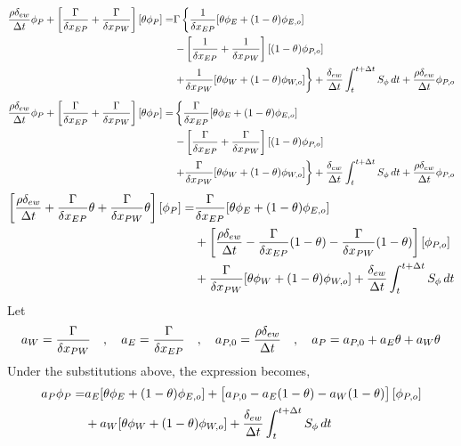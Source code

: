 \documentclass[class=report, 12pt, crop=false]{standalone}
\begin{document}
\begin{center}
\begin{equation*}
\begin{split}
\frac{\rho\delta_{ew}}{\Delta t}\phi_{P} + \left[\frac{\Gamma}{\delta x_{EP}} + \frac{\Gamma}{\delta x_{PW}}\right][\theta\phi_{P}] = & \Gamma \left\{\frac{1}{\delta x_{EP}}[\theta\phi_{E} + (1-\theta)\phi_{E,o}]\right.\\ & \left. - \left[\frac{1}{\delta x_{EP}} + \frac{1}{\delta x_{PW}}\right][(1-\theta)\phi_{P,o}] \right.\\ & \left.  + \frac{1}{\delta x_{PW}}[\theta\phi_{W} + (1-\theta)\phi_{W,o}]\right\} + \frac{\delta_{ew}}{\Delta t}\int^{t+\Delta t}_{t} S_\phi\,dt + \frac{\rho\delta_{ew}}{\Delta t}\phi_{P,o} 
\end{split}
\end{equation*}
\begin{equation*}
\begin{split}
\frac{\rho\delta_{ew}}{\Delta t}\phi_{P} + \left[\frac{\Gamma}{\delta x_{EP}} + \frac{\Gamma}{\delta x_{PW}}\right][\theta\phi_{P}] = & \left\{\frac{\Gamma }{\delta x_{EP}}[\theta\phi_{E} + (1-\theta)\phi_{E,o}]\right.\\ & \left. - \left[\frac{\Gamma }{\delta x_{EP}} + \frac{\Gamma }{\delta x_{PW}}\right][(1-\theta)\phi_{P,o}] \right.\\ & \left.  + \frac{\Gamma }{\delta x_{PW}}[\theta\phi_{W} + (1-\theta)\phi_{W,o}]\right\} + \frac{\delta_{ew}}{\Delta t}\int^{t+\Delta t}_{t} S_\phi\,dt + \frac{\rho\delta_{ew}}{\Delta t}\phi_{P,o} 
\end{split}
\end{equation*}
\begin{equation*}
\begin{split}
\left[\frac{\rho\delta_{ew}}{\Delta t} + \frac{\Gamma}{\delta x_{EP}}\theta + \frac{\Gamma}{\delta x_{PW}}\theta\right][\phi_{P}] = & \frac{\Gamma }{\delta x_{EP}}[\theta\phi_{E} + (1-\theta)\phi_{E,o}]\\ & +\left[\frac{\rho\delta_{ew}}{\Delta t} - \frac{\Gamma }{\delta x_{EP}}(1-\theta) - \frac{\Gamma }{\delta x_{PW}}(1-\theta)\right][\phi_{P,o}] \\ &  + \frac{\Gamma }{\delta x_{PW}}[\theta\phi_{W} + (1-\theta)\phi_{W,o}] + \frac{\delta_{ew}}{\Delta t}\int^{t+\Delta t}_{t} S_\phi\,dt 
\end{split}
\end{equation*}
Let 
$$a_W = \frac{\Gamma}{\delta x_{PW}} \quad,\quad a_E = \frac{\Gamma}{\delta x_{EP}} \quad,\quad a_{P,0} = \frac{\rho\delta_{ew}}{\Delta t} \quad,\quad a_{P} = a_{P,0} + a_E\theta + a_W\theta$$
Under the substitutions above, the expression becomes,
\begin{equation*}
\begin{split}
a_P\phi_{P} = & a_E[\t\phi_{E} + (1-\t)\phi_{E,o}] + \l[a_{P,0} - a_E(1-\t) - a_W(1-\t)\r][\phi_{P,o}] \\ & + a_W[\t\phi_{W} + (1-\t)\phi_{W,o}] + \f{\delta_{ew}}{\Delta t}\int^{t+\Delta t}_{t} S_\phi\,dt 

\end{split}
\end{equation*}
\end{center}
\end{document}

